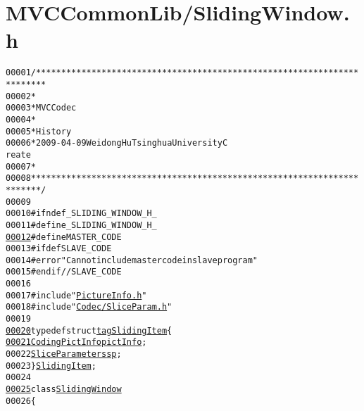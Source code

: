\hypertarget{_sliding_window_8h_source}{
\section{MVCCommonLib/SlidingWindow.h}
}


\begin{footnotesize}\begin{alltt}
00001 \textcolor{comment}{/************************************************************************}
00002 \textcolor{comment}{*}
00003 \textcolor{comment}{* MVC Codec}
00004 \textcolor{comment}{* }
00005 \textcolor{comment}{* History}
00006 \textcolor{comment}{* 2009-04-09            Weidong Hu              Tsinghua University             C
      reate}
00007 \textcolor{comment}{* }
00008 \textcolor{comment}{************************************************************************/}
00009 
00010 \textcolor{preprocessor}{#ifndef \_SLIDING\_WINDOW\_H\_}
00011 \textcolor{preprocessor}{}\textcolor{preprocessor}{#define \_SLIDING\_WINDOW\_H\_}
\hypertarget{_sliding_window_8h_source_l00012}{}\hyperlink{_sliding_window_8h_aac0db9a0280340fa820b89366c85d392}{00012} \textcolor{preprocessor}{}\textcolor{preprocessor}{#define MASTER\_CODE}
00013 \textcolor{preprocessor}{}\textcolor{preprocessor}{#ifdef SLAVE\_CODE}
00014 \textcolor{preprocessor}{}\textcolor{preprocessor}{#error "Can not include master code in slave program"}
00015 \textcolor{preprocessor}{}\textcolor{preprocessor}{#endif // SLAVE\_CODE}
00016 \textcolor{preprocessor}{}
00017 \textcolor{preprocessor}{#include "\hyperlink{_picture_info_8h}{PictureInfo.h}"}
00018 \textcolor{preprocessor}{#include "\hyperlink{_slice_param_8h}{Codec/SliceParam.h}"}
00019 
\hypertarget{_sliding_window_8h_source_l00020}{}\hyperlink{structtag_sliding_item_a3d1f87274664505c5fb9fe06d3cd16d3}{00020} \textcolor{keyword}{typedef} \textcolor{keyword}{struct }\hyperlink{structtag_sliding_item}{tagSlidingItem} \{
\hypertarget{_sliding_window_8h_source_l00021}{}\hyperlink{structtag_sliding_item_a56c9f0817a904f6257d5de4e28c28724}{00021}         \hyperlink{struct_coding_pict_info}{CodingPictInfo} \hyperlink{structtag_sliding_item_a3d1f87274664505c5fb9fe06d3cd16d3}{pictInfo};
00022         \hyperlink{struct_slice_parameters}{SliceParameters} \hyperlink{structtag_sliding_item_a56c9f0817a904f6257d5de4e28c28724}{sp};
00023 \} \hyperlink{structtag_sliding_item}{SlidingItem};
00024 
\hypertarget{_sliding_window_8h_source_l00025}{}\hyperlink{class_sliding_window}{00025} \textcolor{keyword}{class }\hyperlink{class_sliding_window}{SlidingWindow}
00026 \{

\end{alltt}
\end{footnotesize}
